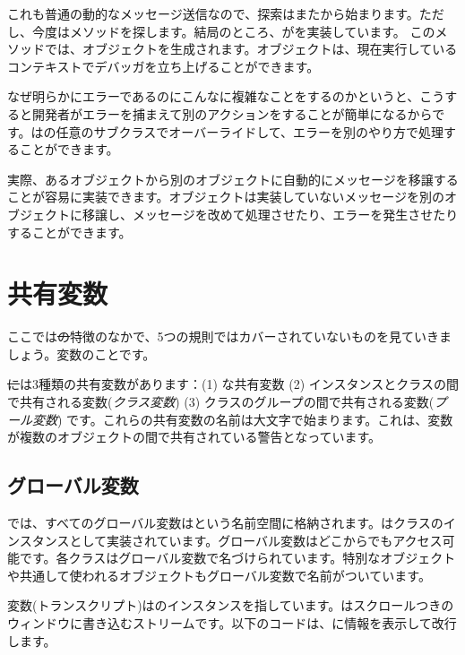 \documentclass[a4paper,10pt,twoside]{book}
\begin{document}
{これも普通の動的なメッセージ送信なので、探索はまたから始まります。ただし、今度はメソッドを探します。結局のところ、がを実装しています。
このメソッドでは、オブジェクトを生成されます。オブジェクトは、現在実行しているコンテキストでデバッガを立ち上げることができます。

なぜ明らかにエラーであるのにこんなに複雑なことをするのかというと、こうすると開発者がエラーを捕まえて別のアクションをすることが簡単になるからです。はの任意のサブクラスでオーバーライドして、エラーを別のやり方で処理することができます。

実際、あるオブジェクトから別のオブジェクトに自動的にメッセージを移譲することが容易に実装できます。オブジェクトは実装していないメッセージを別のオブジェクトに移譲し、メッセージを改めて処理させたり、エラーを発生させたりすることができます。

\section{共有変数}

ここでは\st の特徴のなかで、5つの規則ではカバーされていないものを見ていきましょう。変数のことです。

\st には3種類の共有変数があります：(1) な共有変数 (2) インスタンスとクラスの間で共有される変数(\emph{クラス変数}) (3) クラスのグループの間で共有される変数(\emph{プール変数}) です。これらの共有変数の名前は大文字で始まります。これは、変数が複数のオブジェクトの間で共有されている警告となっています。

\subsection{グローバル変数}
\pharo では、すべてのグローバル変数はという名前空間に格納されます。はクラスのインスタンスとして実装されています。グローバル変数はどこからでもアクセス可能です。各クラスはグローバル変数で名づけられています。特別なオブジェクトや共通して使われるオブジェクトもグローバル変数で名前がついています。

変数(トランスクリプト)はのインスタンスを指しています。はスクロールつきのウィンドウに書き込むストリームです。以下のコードは、に情報を表示して改行します。

}
\end{document}
